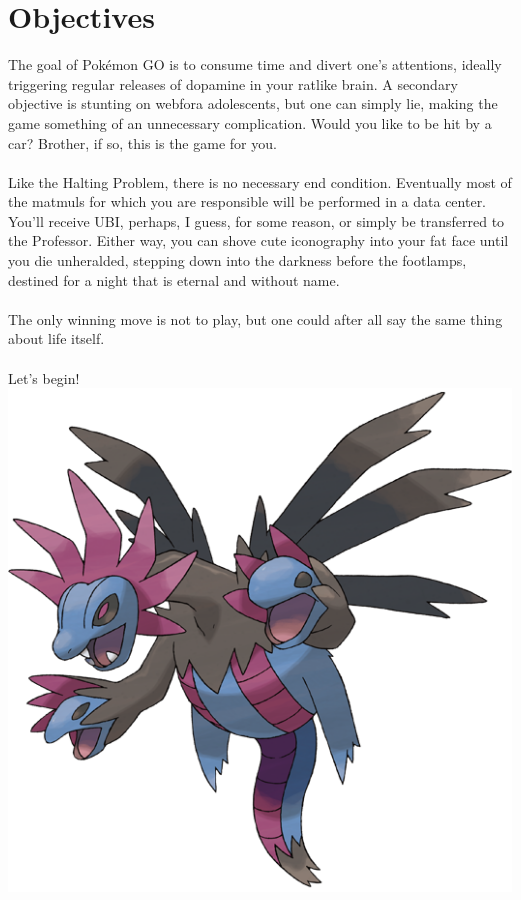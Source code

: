 \chapter{Objectives\label{sec:goal}}
The goal of Pokémon GO is to consume time and divert one's attentions,
  ideally triggering regular releases of dopamine in your ratlike brain.
A secondary objective is stunting on webfora adolescents, but one
  can simply lie, making the game something of an unnecessary complication.
Would you like to be hit by a car? Brother, if so, this is the game for you.\\
\\
Like the Halting Problem, there is no necessary end condition.
Eventually most of the matmuls for which you are responsible will be performed in a data center.
You'll receive UBI, perhaps, I guess, for some reason, or simply be transferred to the Professor.
Either way, you can shove cute iconography into your fat face until you die unheralded,
stepping down into the darkness before the footlamps, destined for a night that is
eternal and without name.\\
\\
The only winning move is not to play, but one could after all say the same
  thing about life itself.\\
\\
Let's begin!
\vfill
\includegraphics[width=.9\linewidth,keepaspectratio]{images/hydreigon.png}
